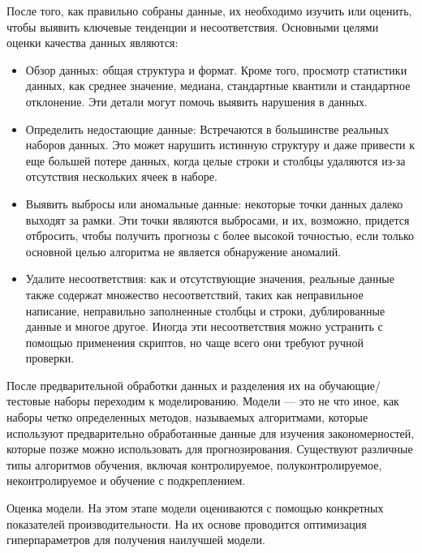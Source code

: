 \documentclass[oneside,14pt]{extarticle} %
\begin{document}
	После того, как правильно собраны данные, их необходимо изучить или оценить, чтобы выявить ключевые тенденции и несоответствия. Основными целями оценки качества данных являются:
	
	\begin{itemize}
		
		\item Обзор данных: общая структура и формат. Кроме того, просмотр статистики данных, как среднее значение, медиана, стандартные квантили и стандартное отклонение. Эти детали могут помочь выявить нарушения в данных.
	
		\item Определить недостающие данные: Встречаются в большинстве реальных наборов данных. Это может нарушить истинную структуру и даже привести к еще большей потере данных, когда целые строки и столбцы удаляются из-за отсутствия нескольких ячеек в наборе.
		
		\item Выявить выбросы или аномальные данные: некоторые точки данных далеко выходят за рамки. Эти точки являются выбросами, и их, возможно, придется отбросить, чтобы получить прогнозы с более высокой точностью, если только основной целью алгоритма не является обнаружение аномалий.
		
		\item Удалите несоответствия: как и отсутствующие значения, реальные данные также содержат множество несоответствий, таких как неправильное написание, неправильно заполненные столбцы и строки, дублированные данные и многое другое. Иногда эти несоответствия можно устранить с помощью применения скриптов, но чаще всего они требуют ручной проверки.
		
	\end{itemize}
	
	После предварительной обработки данных и разделения их на обучающие/тестовые наборы переходим к моделированию. Модели — это не что иное, как наборы четко определенных методов, называемых алгоритмами, которые используют предварительно обработанные данные для изучения закономерностей, которые позже можно использовать для прогнозирования. Существуют различные типы алгоритмов обучения, включая контролируемое, полуконтролируемое, неконтролируемое и обучение с подкреплением. 
	
	Оценка модели. На этом этапе модели оцениваются с помощью конкретных показателей производительности. На их основе проводится оптимизация гиперпараметров для получения наилучшей модели.
	
\end{document}
